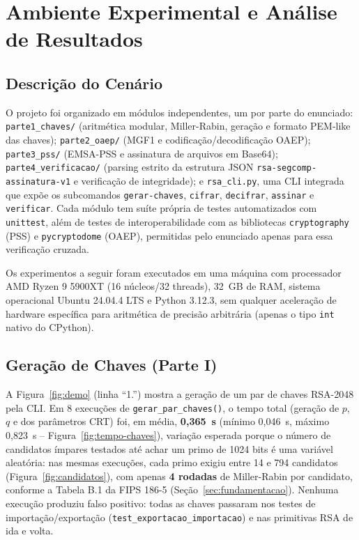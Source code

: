 \documentclass[conference]{IEEEtran}
\begin{document}
\section{Ambiente Experimental e Análise de Resultados}
\label{sec:experimental}

\subsection{Descrição do Cenário}

O projeto foi organizado em módulos independentes, um por parte do
enunciado: \texttt{parte1\_chaves/} (aritmética modular, Miller-Rabin,
geração e formato PEM-like das chaves); \texttt{parte2\_oaep/} (MGF1 e
codificação/decodificação OAEP); \texttt{parte3\_pss/} (EMSA-PSS e
assinatura de arquivos em Base64); \texttt{parte4\_verificacao/} (parsing
estrito da estrutura JSON \texttt{rsa-segcomp-assinatura-v1} e verificação
de integridade); e \texttt{rsa\_cli.py}, uma CLI integrada que expõe os
subcomandos \texttt{gerar-chaves}, \texttt{cifrar}, \texttt{decifrar},
\texttt{assinar} e \texttt{verificar}. Cada módulo tem suíte própria de
testes automatizados com \texttt{unittest}, além de testes de
interoperabilidade com as bibliotecas \texttt{cryptography} (PSS) e
\texttt{pycryptodome} (OAEP), permitidas pelo enunciado apenas para essa
verificação cruzada.

Os experimentos a seguir foram executados em uma máquina com processador
AMD Ryzen 9 5900XT (16 núcleos/32 threads), 32~GB de RAM, sistema
operacional Ubuntu 24.04.4 LTS e Python 3.12.3, sem qualquer aceleração de
hardware específica para aritmética de precisão arbitrária (apenas o tipo
\texttt{int} nativo do CPython).

\subsection{Geração de Chaves (Parte I)}

A Figura~\ref{fig:demo} (linha ``1.'') mostra a geração de um par de
chaves RSA-2048 pela CLI. Em 8 execuções de \texttt{gerar\_par\_chaves()},
o tempo total (geração de $p$, $q$ e dos parâmetros CRT) foi, em média,
\textbf{0,365~s} (mínimo 0,046~s, máximo 0,823~s -- Figura~\ref{fig:tempo-chaves}),
variação esperada porque o número de candidatos ímpares testados até achar
um primo de 1024 bits é uma variável aleatória: nas mesmas execuções, cada
primo exigiu entre 14 e 794 candidatos (Figura~\ref{fig:candidatos}), com
apenas \textbf{4 rodadas} de Miller-Rabin por candidato, conforme a Tabela
B.1 da FIPS 186-5 (Seção~\ref{sec:fundamentacao}). Nenhuma execução
produziu falso positivo: todas as chaves passaram nos testes de
importação/exportação (\texttt{test\_exportacao\_importacao}) e nas
primitivas RSA de ida e volta.
\end{document}
